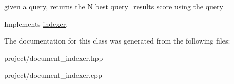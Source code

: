 given a query, returns the N best query\+\_\+results score using the query 

Implements \hyperlink{classindexer}{indexer}.



The documentation for this class was generated from the following files\+:\begin{DoxyCompactItemize}
\item 
project/document\+\_\+indexer.\+hpp\item 
project/document\+\_\+indexer.\+cpp\end{DoxyCompactItemize}
